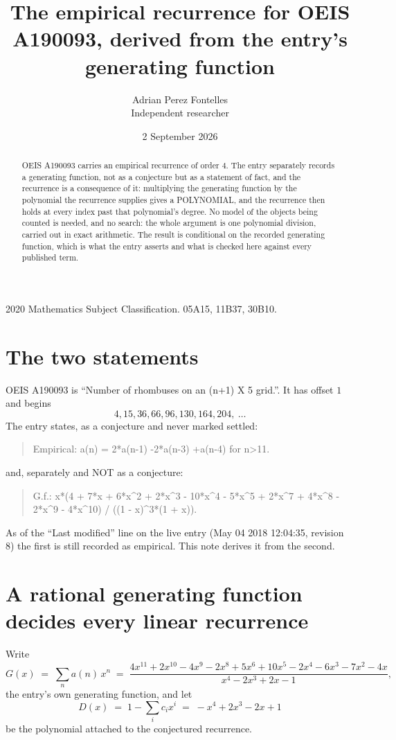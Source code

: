 \documentclass[11pt,a4paper]{article}
\title{The empirical recurrence for OEIS A190093, derived from the entry's generating function}
\author{Adrian Perez Fontelles\\ \small Independent researcher}
\date{2 September 2026}
\theoremstyle{plain}
\theoremstyle{definition}
\begin{document}
\maketitle

\begin{abstract}
OEIS A190093 carries an empirical recurrence of order $4$. The entry separately records a
generating function, not as a conjecture but as a statement of fact, and the recurrence is a
consequence of it: multiplying the generating function by the polynomial the recurrence
supplies gives a POLYNOMIAL, and the recurrence then holds at every index past that
polynomial's degree. No model of the objects being counted is needed, and no search: the
whole argument is one polynomial division, carried out in exact arithmetic. The result is
conditional on the recorded generating function, which is what the entry asserts and what is
checked here against every published term.
\end{abstract}

\noindent\small 2020 Mathematics Subject Classification. 05A15, 11B37, 30B10.\normalsize

\section{The two statements}

OEIS A190093 is ``Number of rhombuses on an (n+1) X 5 grid.''. It has offset $1$ and begins
\[
4, 15, 36, 66, 96, 130, 164, 204,\ \dots
\]
The entry states, as a conjecture and never marked settled:
\begin{quote}
Empirical: a(n) = 2*a(n-1) -2*a(n-3) +a(n-4) for n>11.
\end{quote}
and, separately and NOT as a conjecture:
\begin{quote}
G.f.: x*(4 + 7*x + 6*x\^{}2 + 2*x\^{}3 - 10*x\^{}4 - 5*x\^{}5 + 2*x\^{}7 + 4*x\^{}8 - 2*x\^{}9 - 4*x\^{}10) / ((1 - x)\^{}3*(1 + x)).
\end{quote}
As of the ``Last modified'' line on the live entry (May 04 2018 12:04:35, revision 8) the first is still
recorded as empirical. This note derives it from the second.

\section{A rational generating function decides every linear recurrence}

Write
\[
G(x)\;=\;\sum_{n}a(n)\,x^{n}\;=\;\frac{4 x^{11} + 2 x^{10} - 4 x^{9} - 2 x^{8} + 5 x^{6} + 10 x^{5} - 2 x^{4} - 6 x^{3} - 7 x^{2} - 4 x}{x^{4} - 2 x^{3} + 2 x - 1},
\]
the entry's own generating function, and let
\[
D(x)\;=\;1-\sum_i c_i x^{i}\;=\;- x^{4} + 2 x^{3} - 2 x + 1
\]
be the polynomial attached to the conjectured recurrence.
\end{document}
